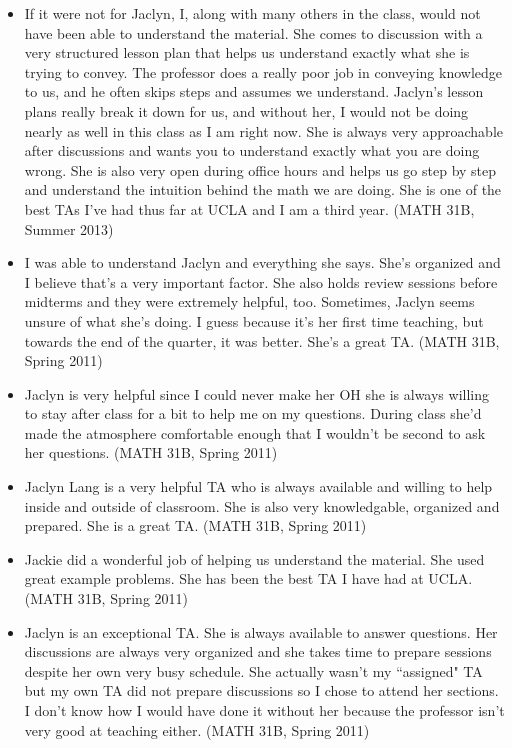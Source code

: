 \documentclass[11pt]{article}
\theoremstyle{plain} \numberwithin{equation}{section}
\theoremstyle{definition}
\begin{document}
{\begin{description}
\begin{itemize}
		\item If it were not for Jaclyn, I, along with many others in the class, would not have been able to understand the material.  She comes to discussion with a very structured lesson plan that helps us understand exactly what she is trying to convey.  The professor does a really poor job in conveying knowledge to us, and he often skips steps and assumes we understand.  Jaclyn's lesson plans really break it down for us, and without her, I would not be doing nearly as well in this class as I am right now.  She is always very approachable after discussions and wants you to understand exactly what you are doing wrong.  She is also very open during office hours and helps us go step by step and understand the intuition behind the math we are doing.  She is one of the best TAs I've had thus far at UCLA and I am a third year.  (MATH 31B, Summer 2013)
		\item I was able to understand Jaclyn and everything she says.  She's organized and I believe that's a very important factor.  She also holds review sessions before midterms and they were extremely helpful, too.  Sometimes, Jaclyn seems unsure of what she's doing.  I guess because it's her first time teaching, but towards the end of the quarter, it was better.  She's a great TA.  (MATH 31B, Spring 2011)
		\item Jaclyn is very helpful since I could never make her OH she is always willing to stay after class for a bit to help me on my questions.  During class she'd made the atmosphere comfortable enough that I wouldn't be second to ask her questions.  (MATH 31B, Spring 2011)
		\item Jaclyn Lang is a very helpful TA who is always available and willing to help inside and outside of classroom.  She is also very knowledgable, organized and prepared.  She is a great TA.  (MATH 31B, Spring 2011)
		\item Jackie did a wonderful job of helping us understand the material.  She used great example problems.  She has been the best TA I have had at UCLA.  (MATH 31B, Spring 2011)
		\item Jaclyn is an exceptional TA.  She is always available to answer questions.  Her discussions are always very organized and she takes time to prepare sessions despite her own very busy schedule.  She actually wasn't my ``assigned" TA but my own TA did not prepare discussions so I chose to attend her sections.  I don't know how I would have done it without her because the professor isn't very good at teaching either.  (MATH 31B, Spring 2011)
	\end{itemize}


\end{description}}
\end{document}
